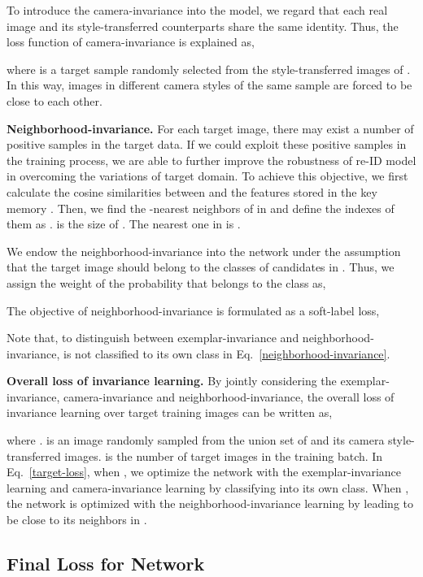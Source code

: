 \documentclass[10pt,twocolumn,letterpaper]{article}
\begin{document}
To introduce the camera-invariance into the model, we regard that each real image and its style-transferred counterparts share the same identity. Thus, the loss function of camera-invariance is explained as,

where  is a target sample randomly selected from the style-transferred images of . In this way, images in different camera styles of the same sample are forced to be close to each other.


\textbf{Neighborhood-invariance.} For each target image, there may exist a number of positive samples in the target data. If we could exploit these positive samples in the training process, we are able to further improve the robustness of re-ID model in overcoming the variations of target domain. To achieve this objective, we first calculate the cosine similarities between  and the features stored in the key memory . Then, we find the -nearest neighbors of  in  and define the indexes of them as .  is the size of . The nearest one in  is .


We endow the neighborhood-invariance into the network under the assumption that the target image  should belong to the classes of candidates in . Thus, we assign the weight of the probability that  belongs to the class  as,

The objective of neighborhood-invariance is formulated as a soft-label loss,

Note that, to distinguish between exemplar-invariance and neighborhood-invariance,  is not classified to its own class in Eq.~\ref{neighborhood-invariance}.


\textbf{Overall loss of invariance learning.} By jointly considering the exemplar-invariance, camera-invariance and neighborhood-invariance, the overall loss of invariance learning over target training images can be written as,

where .  is an image randomly sampled from the union set of  and its camera style-transferred images.  is the number of target images in the training batch. In Eq.~\ref{target-loss}, when , we optimize the network with the exemplar-invariance learning and camera-invariance learning by classifying  into its own class. When , the network is optimized with the neighborhood-invariance learning by leading  to be close to its neighbors in . 



\subsection{Final Loss for Network}
\end{document}
